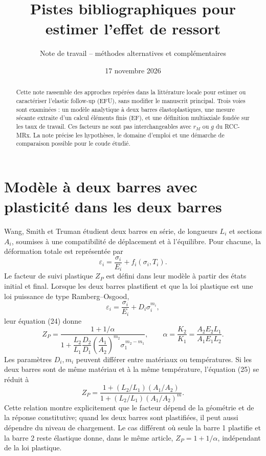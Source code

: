 \documentclass[11pt,a4paper]{article}
\title{Pistes bibliographiques pour estimer l'effet de ressort}
\author{Note de travail -- méthodes alternatives et complémentaires}
\date{17 novembre 2026}
\begin{document}
\maketitle

\begin{abstract}
Cette note rassemble des approches repérées dans la littérature locale pour
estimer ou caractériser l'elastic follow-up (EFU), sans modifier le manuscrit
principal. Trois voies sont examinées : un modèle analytique à deux barres
élastoplastiques, une mesure sécante extraite d'un calcul éléments finis (EF),
et une définition multiaxiale fondée sur les taux de travail. Ces facteurs ne
sont pas interchangeables avec \(r_M\) ou \(g\) du RCC-MRx. La note précise les
hypothèses, le domaine d'emploi et une démarche de comparaison possible pour le
coude étudié.
\end{abstract}

\section{Modèle à deux barres avec plasticité dans les deux barres}

Wang, Smith et Truman étudient deux barres en série, de longueurs \(L_i\) et
sections \(A_i\), soumises à une compatibilité de déplacement et à l'équilibre.
Pour chacune, la déformation totale est représentée par
\[
  \varepsilon_i=\frac{\sigma_i}{E_i}+f_i(\sigma_i,T_i).
\]
Le facteur de suivi plastique \(Z_P\) est défini dans leur modèle à partir des
états initial et final. Lorsque les deux barres plastifient et que la loi
plastique est une loi puissance de type Ramberg--Osgood,
\[
  \varepsilon_i=\frac{\sigma_i}{E_i}+D_i\sigma_i^{m_i},
\]
leur équation (24) donne
\[
  Z_P=
  \frac{1+1/\alpha}
       {1+\dfrac{L_2}{L_1}\dfrac{D_2}{D_1}
       \left(\dfrac{A_1}{A_2}\right)^{m_2}
       \sigma_1^{\,m_2-m_1}},
  \qquad
  \alpha=\frac{K_2}{K_1}
  =\frac{A_2E_2L_1}{A_1E_1L_2}.
\]
Les paramètres \(D_i,m_i\) peuvent différer entre matériaux ou températures.
Si les deux barres sont de même matériau et à la même température, l'équation
(25) se réduit à
\[
  Z_P=
  \frac{1+(L_2/L_1)(A_1/A_2)}
       {1+(L_2/L_1)(A_1/A_2)^m}.
\]
Cette relation montre explicitement que le facteur dépend de la géométrie et
de la réponse constitutive; quand les deux barres sont plastifiées, il peut
aussi dépendre du niveau de chargement. Le cas différent où seule la barre 1
plastifie et la barre 2 reste élastique donne, dans le même article,
\(Z_P=1+1/\alpha\), indépendant de la loi plastique.
\end{document}
